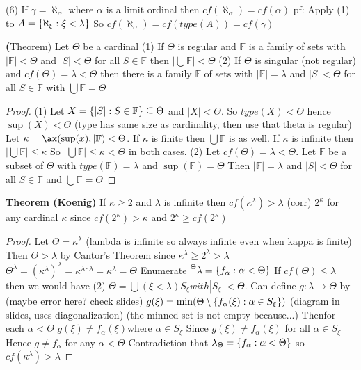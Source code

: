 (6) If $\gamma = \aleph_\alpha$ where $\alpha$ is a limit ordinal then $cf(\aleph_\alpha) = cf(\alpha)$
pf:
    Apply (1) to $A=\{\aleph_\xi : \xi < \lambda\}$
    So $cf(\aleph_\alpha) = cf(type(A)) = cf(\gamma)$


\textbf(Theorem) Let $\Theta$ be a cardinal
(1) If $\Theta$ is regular and $\mathbb{F}$ is a family of sets with $|\mathbb{F}| < \Theta$ and $|S|<\Theta$ for all $S \in \mathbb{F}$
then $|\bigcup \mathbb{F}| < \Theta$
(2) If $\Theta$ is singular (not regular) and $cf(\Theta) = \lambda < \Theta$ then there is a family $\mathbb{F}$ of sets with
$|\mathbb{F}| = \lambda$ and $|S| < \Theta$ for all $S \in \mathbb{F}$ with $\bigcup \mathbb{F} = \Theta$

\begin{proof}
(1) Let $X = \{|S| : S \in \mathbb{F}\} \subseteq \Theta$ and $|X| < \Theta$.
    So $type(X) < \Theta$ hence $\sup(X) < \Theta$ (type has same size as cardinality, then use that theta is regular)
    Let $\kappa=\ax(\sup(x), |\mathbb{F}) < \Theta$.
    If $\kappa$ is finite then $\bigcup \mathbb{F}$ is as well.
    If $\kappa$ is infinite then $|\bigcup \mathbb{F}| \leq \kappa$
    So $|\bigcup \mathbb{F}| \leq \kappa < \Theta$ in both cases.
(2) Let $cf(\Theta) = \lambda < \Theta$.
    Let $\mathbb{F}$ be a subset of $\Theta$ with $type(\mathbb{F}) = \lambda$ and $\sup(\mathbb{F}) = \Theta$
    Then $|\mathbb{F}| = \lambda$ and $|S| < \Theta$ for all $S \in \mathbb{F}$
    and $\bigcup \mathbb{F} = \Theta$
\end{proof}

\textbf{Theorem (Koenig)}
If $\kappa \geq 2$ and $\lambda$ is infinite then $cf(\kappa^\lambda) > \lambda$
\underline(corr) $2^\kappa$ for any cardinal $\kappa$
since $cf(2^\kappa)>\kappa$ and $2^\kappa \geq cf(2^\kappa)$

\begin{proof}
    Let $\Theta = \kappa^\lambda$ (lambda is infinite so always infinte even when kappa is finite)
    Then $\Theta > \lambda$ by Cantor's Theorem since $\kappa^\lambda \geq 2^\lambda > \lambda$
    $\Theta^\lambda = (\kappa^\lambda)^\lambda = \kappa^{\lambda \cdot \lambda} = \kappa^\lambda = \Theta$
    Enumerate $\leftsuperscript{\lambda}{\Theta} = \set{f_\alpha : \alpha < \Theta}$
    If $cf(\Theta) \leq \lambda$ then we would have (2)
    $\Theta = \bigcup(\xi < \lambda) S_{\xi} with |S_\xi| < \Theta$.
    Can define $g: \lambda \rightarrow \Theta$ by (maybe error here? check slides)
    $g(\xi) = \min(\Theta \setminus \{f_\alpha(\xi) : \alpha \in S_\xi\})$
    (diagram in slides, uses diagonalization)
    (the minned set is not empty because...)
    Thenfor each $\alpha < \Theta$ $g(\xi) \neq f_\alpha(\xi)$where $\alpha \in S_\xi$
    Since $g(\xi) \neq f_\alpha(\xi)$ for all $\alpha \in S_\xi$
    Hence $g \neq f_\alpha$ for any $\alpha < \Theta$
    Contradiction that $\lambda_\Theta = \{f_\alpha : \alpha < \Theta\}$
    so $cf(\kappa^\lambda) > \lambda$

\end{proof}

